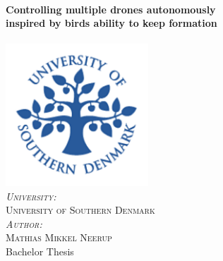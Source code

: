 \begin{titlepage}


\center %
 



\HRule \\[0.4cm]
{ \huge \textbf{ Controlling multiple drones autonomously \\ inspired by birds ability to keep formation}}\\[0.4cm] %

\HRule \\[1.5cm]
\includegraphics[width=0.4\textwidth]{University_of_Southern_Denmark-logo} \\
\textsc{\large \emph{University:} \\   University of Southern Denmark }\\[0.5cm] %
\textsc{\large \emph{Author:} \\ Mathias Mikkel Neerup }\\[0.5cm] %


\LARGE Bachelor Thesis\\[1.5cm] %
 


\end{titlepage}
